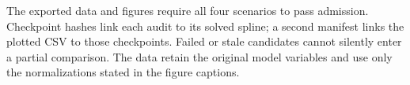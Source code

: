 The exported data and figures require all four scenarios to pass admission.
Checkpoint hashes link each audit to its solved spline; a second manifest
links the plotted CSV to those checkpoints. Failed or stale candidates
cannot silently enter a partial comparison. The data retain the original
model variables and use only the normalizations stated in the figure
captions.
\else
\ifshowcalibratedrsiscenarios

\else

\fi
\fi
